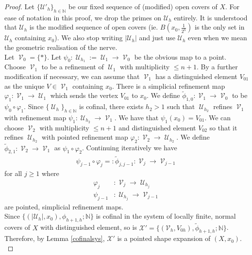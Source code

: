 \documentclass[a4paper,11pt]{article}
\theoremstyle{definition}
\theoremstyle{plain}
\theoremstyle{remark}
\DeclareMathOperator{\V}{\mathcal{V}}
\DeclareMathOperator{\U}{\mathcal{U}}
\begin{document}
{\begin{proof}  
Let $\{\mathcal{U}'_{h}\}_{h\in \mathbb{N}}$ be our fixed sequence of (modified) open covers of $X$. For ease of notation in this proof, we drop the primes on $\mathcal{U}_{h}$ entirely. It is understood that $\mathcal{U}_{h}$ is the modified sequence of open covers (ie. $B(x_0,\frac{1}{2^h})$ is the only set in $\mathcal{U}_{h}$ containing $x_0$). We also stop writing $|\mathcal{U}_{h}|$ and just use $\mathcal{U}_{h}$ even when we mean the geometric realisation of the nerve.\\

Let $\V_{0} = \{\ast\}$. Let $\psi_{0}: \U_{h_1}:=\U_1\rightarrow \V_0$ be the obvious map to a point. Choose $\V_{1}$ to be a refinement of $\U_1$ with multiplicity $\leq n+1$.  By a further modification if necessary,  we can assume that  $\V_{1}$ has a distinguished element $V_{01}$ as the unique $V\in \V_{1}$  containing $x_0$.  There is a simplicial refinement map  $\varphi_1: \V_1\rightarrow \U_1$ which sends the vertex $V_{01}$ to $x_0$. We define $\tilde{\phi}_{1,0}: \V_1\rightarrow \V_0$ to be $\psi_{0}\circ \varphi_1$. Since $\{\U_{h}\}_{h\in \mathbb{N}}$ is cofinal, there exists $h_2 > 1$ such that $\U_{h_2}$ refines $\V_1$ with refinement map $\psi_1: \U_{h_2}\rightarrow \V_1$. We have that $\psi_1(x_0) = V_{01}$. We can choose $\V_{2}$ with multiplicity $\leq n+1$ and distinguished element $V_{02}$ so that it refines $\U_{h_2}$ with pointed refinement map $\varphi_{2}: \V_{2}\rightarrow \U_{h_2}$. We define $\tilde{\phi}_{2,1}: \V_2\rightarrow \V_1$ as $\psi_1\circ \varphi_2$. Continuing iteratively we have
\begin{align*}
\psi_{j-1}\circ \varphi_j=:\tilde{\phi}_{j,j-1}: \V_{j} \rightarrow \V_{j-1}
\end{align*}
for all $j\geq 1$ where 
\begin{align*}
\varphi_{j}&: \V_{j}\rightarrow \U_{h_{j}}\\
\psi_{j-1}&: \U_{h_{j}} \rightarrow \V_{j-1} 
\end{align*}
are pointed, simplicial refinement maps.\\

Since $\{(|\mathcal{U}_{h}|,x_0),\phi_{h+1,h};\mathbb{N}\}$ is cofinal in the system of locally finite, normal covers of $X$ with distinguished element, so is $\mathcal{X}'=\{(\mathcal{V}_{h}, V_{0h}),\tilde{\phi}_{h+1,h}; \mathbb{N}\}$. Therefore, by Lemma \ref{cofinalsys}, $\mathcal{X}'$ is a pointed shape expansion of $(X,x_0)$. \\


\end{proof}}
\end{document}
